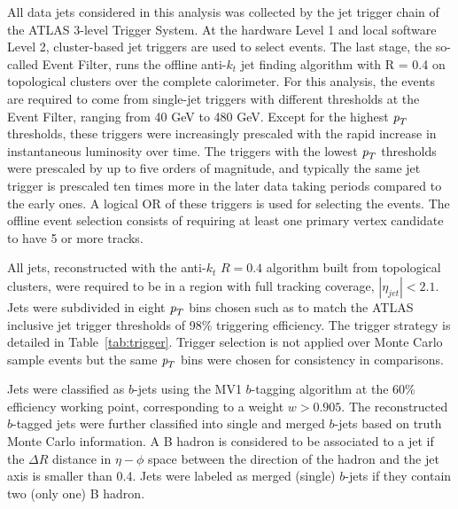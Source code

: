 
All data jets considered in this analysis was collected by the jet trigger chain of the ATLAS  3-level Trigger System. At the hardware Level 1 and local software Level 2, cluster-based jet triggers are used to select events. The last stage, the so-called Event Filter, runs  the offline anti-$k_t$ jet finding algorithm with R = 0.4 on topological clusters over the complete calorimeter. For this analysis, the events are required to come from single-jet triggers with different thresholds at the Event Filter, ranging from 40 GeV to 480 GeV. Except for the highest ${\emph{p}_{T}}$ thresholds, these triggers were increasingly prescaled with the rapid increase in instantaneous luminosity over time. The triggers with the lowest ${\emph{p}_{T}}$ thresholds were prescaled by up to five orders of magnitude, and typically the same jet trigger is prescaled ten times more in the later data taking periods compared to the early ones. A logical OR of these triggers is used for selecting the events. The offline event selection consists of requiring at least one primary vertex candidate to have 5 or more tracks. 



All jets, reconstructed with the anti-$k_t$ $R=0.4$ algorithm built from topological clusters, were required to be in a region with full tracking coverage, $|\eta_{jet}|<2.1$. Jets were subdivided in eight ${\emph{p}_{T}}$ bins chosen such as to match the ATLAS inclusive jet trigger thresholds of 98\% triggering efficiency. The trigger strategy is detailed in Table~\ref{tab:trigger}. Trigger selection is not applied over Monte Carlo sample events but the same ${\emph{p}_{T}}$ bins were chosen for consistency in comparisons.

Jets were classified as $b$-jets using the MV1 $b$-tagging algorithm at the 60\% efficiency working point, corresponding to a weight $w > 0.905$. The reconstructed $b$-tagged jets were further classified into single and merged $b$-jets based on truth Monte Carlo information. A B hadron is considered to be associated to a jet if the $\Delta R$ distance in $\eta-\phi$ space between the direction of the hadron and the jet axis is smaller than 0.4. Jets were labeled as merged (single) $b$-jets if they contain two (only one) B hadron.

